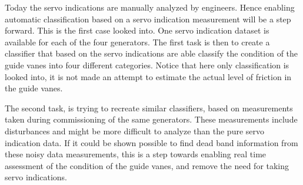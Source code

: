        Today the servo indications are manually analyzed by engineers. Hence enabling automatic classification based on a servo indication measurement will be a step forward. This is the first case looked into. One servo indication dataset is available for each of the four generators. The first task is then to create a classifier that based on the servo indications are able classify the condition of the guide vanes into four different categories. Notice that here only classification is looked into, it is not made an attempt to estimate the actual level of friction in the guide vanes.
        
        The second task, is trying to recreate similar classifiers, based on measurements taken during commissioning of the same generators. These measurements include disturbances and might be more difficult to analyze than the pure servo indication data. If it could be shown possible to find dead band information from these noisy data measurements, this is a step towards enabling real time assessment of the condition of the guide vanes, and remove the need for taking servo indications.

        
        
        
        
        
        
    
        
        

